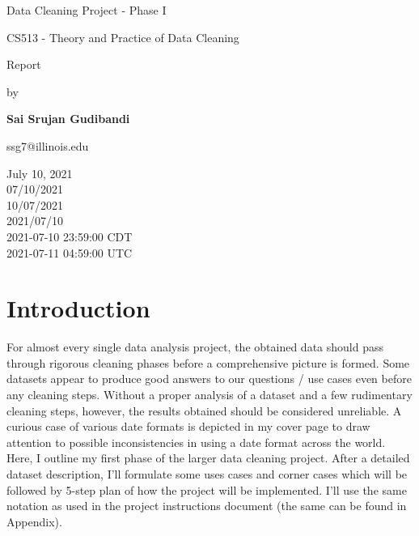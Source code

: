 \documentclass[10pt]{article}
\begin{document}
\begin{titlepage}
   \begin{center}
       \vspace*{1cm}

       {\Huge Data Cleaning Project - Phase I}
            
       \vspace*{0.5cm}
       
       {\Large CS513 - Theory and Practice of Data Cleaning}
       
       \vspace*{3.5cm}
       
       {\Large Report}
       
       \vspace*{0.25cm}
       
       {\large by}
       
       \vspace*{1cm}
       
       \textbf{\huge Sai Srujan Gudibandi}

       \vspace{0.5cm}
            
       {\Large ssg7@illinois.edu}
            
       \vfill
     
       {\large July 10, 2021\\07/10/2021\\10/07/2021\\2021/07/10\\ 2021-07-10 23:59:00 CDT\\ 2021-07-11 04:59:00 UTC}
            
   \end{center}
\end{titlepage}


\section{Introduction } \label{intro}
For almost every single data analysis project, the obtained data should pass through rigorous cleaning phases before a comprehensive picture is formed. Some datasets appear to produce good answers to our questions / use cases even before any cleaning steps. Without a proper analysis of a dataset and a few rudimentary cleaning steps, however, the results obtained should be considered unreliable.  A curious case of various date formats is depicted in my cover page to draw attention to possible inconsistencies in using a date format across the world. Here, I outline my first phase of the larger data cleaning project. After a detailed dataset description, I'll formulate some uses cases and corner cases which will be followed by 5-step plan of how the project will be implemented. I'll use the same notation as used in the project instructions document (the same can be found in Appendix).
 
\end{document}
